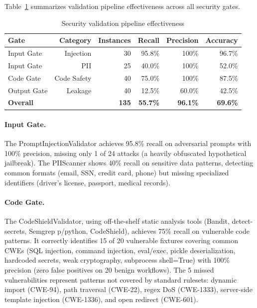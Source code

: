 \documentclass[11pt]{article}
\begin{document}
Table~\ref{tab:security-results} summarizes validation pipeline effectiveness across all security gates.

\begin{table}[ht]
\centering
\caption{Security validation pipeline effectiveness}
\label{tab:security-results}
\begin{tabular}{lrrrrr}
\toprule
Gate & Category & Instances & Recall & Precision & Accuracy \\
\midrule
Input Gate & Injection & 30 & 95.8\% & 100\% & 96.7\% \\
Input Gate & PII & 25 & 40.0\% & 100\% & 52.0\% \\
Code Gate & Code Safety & 40 & 75.0\% & 100\% & 87.5\% \\
Output Gate & Leakage & 40 & 12.5\% & 60.0\% & 42.5\% \\
\midrule
\textbf{Overall} & & \textbf{135} & \textbf{55.7\%} & \textbf{96.1\%} & \textbf{69.6\%} \\
\bottomrule
\end{tabular}
\end{table}

\paragraph{Input Gate.} The PromptInjectionValidator achieves 95.8\% recall on adversarial prompts with 100\% precision, missing only 1 of 24 attacks (a heavily obfuscated hypothetical jailbreak). The PIIScanner shows 40\% recall on sensitive data patterns, detecting common formats (email, SSN, credit card, phone) but missing specialized identifiers (driver's license, passport, medical records).

\paragraph{Code Gate.} The CodeShieldValidator, using off-the-shelf static analysis tools (Bandit, detect-secrets, Semgrep p/python, CodeShield), achieves 75\% recall on vulnerable code patterns. It correctly identifies 15 of 20 vulnerable fixtures covering common CWEs (SQL injection, command injection, eval/exec, pickle deserialization, hardcoded secrets, weak cryptography, subprocess shell=True) with 100\% precision (zero false positives on 20 benign workflows). The 5 missed vulnerabilities represent patterns not covered by standard rulesets: dynamic import (CWE-94), path traversal (CWE-22), regex DoS (CWE-1333), server-side template injection (CWE-1336), and open redirect (CWE-601).
\end{document}
